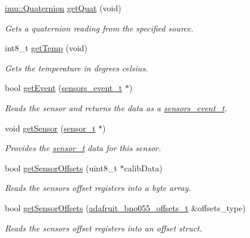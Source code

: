 \begin{DoxyCompactItemize}
\hyperlink{classimu_1_1Quaternion}{imu\+::\+Quaternion} \hyperlink{classAdafruit__BNO055_a2ff039fc32f35334a37d6ca38779dc63}{get\+Quat} (void)
\begin{DoxyCompactList}\small\item\em Gets a quaternion reading from the specified source. \end{DoxyCompactList}\item 
int8\+\_\+t \hyperlink{classAdafruit__BNO055_a24cc55621072b056be8adf6754ef74eb}{get\+Temp} (void)
\begin{DoxyCompactList}\small\item\em Gets the temperature in degrees celsius. \end{DoxyCompactList}\item 
bool \hyperlink{classAdafruit__BNO055_a8c91811617bd61d7c130ae8b79dd58ee}{get\+Event} (\hyperlink{structsensors__event__t}{sensors\+\_\+event\+\_\+t} $\ast$)
\begin{DoxyCompactList}\small\item\em Reads the sensor and returns the data as a \hyperlink{structsensors__event__t}{sensors\+\_\+event\+\_\+t}. \end{DoxyCompactList}\item 
void \hyperlink{classAdafruit__BNO055_a1a0849285f6cebde09b4812d9683010c}{get\+Sensor} (\hyperlink{structsensor__t}{sensor\+\_\+t} $\ast$)
\begin{DoxyCompactList}\small\item\em Provides the \hyperlink{structsensor__t}{sensor\+\_\+t} data for this sensor. \end{DoxyCompactList}\item 
bool \hyperlink{classAdafruit__BNO055_a9ef7b25de21d0a0c3a561bc74d8eb59a}{get\+Sensor\+Offsets} (uint8\+\_\+t $\ast$calib\+Data)
\begin{DoxyCompactList}\small\item\em Reads the sensor\textquotesingle{}s offset registers into a byte array. \end{DoxyCompactList}\item 
bool \hyperlink{classAdafruit__BNO055_ab5325dfe2c54d13f103b9fec89188107}{get\+Sensor\+Offsets} (\hyperlink{structadafruit__bno055__offsets__t}{adafruit\+\_\+bno055\+\_\+offsets\+\_\+t} \&offsets\+\_\+type)
\begin{DoxyCompactList}\small\item\em Reads the sensor\textquotesingle{}s offset registers into an offset struct. \end{DoxyCompactList}\item 

\end{DoxyCompactItemize}
